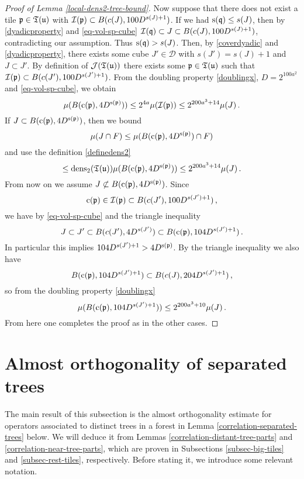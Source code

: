 {\begin{proof}[Proof of Lemma \ref{local-dens2-tree-bound}]
    Now suppose that there does not exist a tile ${\mathfrak p} \in {\mathfrak T}({\mathfrak u})$ with ${\mathcal{I}}({\mathfrak p}) \subset B(c(J), 100 D^{s(J) + 1})$. If we had ${\mathrm{s}}({\mathfrak q}) \le s(J)$, then by \eqref{dyadicproperty} and \eqref{eq-vol-sp-cube}  ${\mathcal{I}}({\mathfrak q}) \subset J \subset B(c(J), 100 D^{s(J) + 1})$, contradicting our assumption. Thus ${\mathrm{s}}({\mathfrak q}) > s(J)$. Then, by \eqref{coverdyadic} and \eqref{dyadicproperty}, there exists some cube $J' \in \mathcal{D}$ with $s(J') = s(J) + 1$ and $J \subset J'$. By definition of $\mathcal{J}({\mathfrak T}({\mathfrak u}))$ there exists some ${\mathfrak p} \in {\mathfrak T}({\mathfrak u})$ such that ${\mathcal{I}}({\mathfrak p}) \subset B(c(J'), 100 D^{s(J') + 1})$.  From the doubling property \eqref{doublingx}, $D=2^{100a^2}$ and \eqref{eq-vol-sp-cube}, we obtain
    \begin{equation}
        \label{eq-measure-comparison-1}
        \mu(B({\mathrm{c}}({\mathfrak p}), 4D^{{\mathrm{s}}({\mathfrak p})})) \le 2^{4a} \mu({\mathcal{I}}({\mathfrak p})) \le 2^{200a^3 + 14} \mu(J)\,.
    \end{equation}
    If $J \subset B({\mathrm{c}}({\mathfrak p}), 4 D^{{\mathrm{s}}({\mathfrak p})})$, then we bound
    $$
        \mu(J \cap F) \le \mu(B({\mathrm{c}}({\mathfrak p}), 4D^{{\mathrm{s}}({\mathfrak p})}) \cap F)
    $$
    and use the definition \eqref{definedens2}
    $$
        \le \operatorname{\operatorname{dens}}_2({\mathfrak T}({\mathfrak u})) \mu(B({\mathrm{c}}({\mathfrak p}), 4D^{{\mathrm{s}}({\mathfrak p})})) \le 2^{200a^3 + 14} \mu(J)\,.
    $$
    From now on we assume $J \not \subset B({\mathrm{c}}({\mathfrak p}), 4 D^{{\mathrm{s}}({\mathfrak p})})$.
    Since
    \begin{equation*}
        {\mathrm{c}}({\mathfrak p}) \in {\mathcal{I}}({\mathfrak p}) \subset B(c(J'), 100 D^{s(J') + 1})\, ,
    \end{equation*}
    we have by \eqref{eq-vol-sp-cube} and the triangle inequality
    $$
        J \subset J' \subset B(c(J'), 4D^{s(J')}) \subset B({\mathrm{c}}({\mathfrak p}), 104 D^{s(J') + 1})\,.
    $$
    In particular this implies $104 D^{s(J') + 1} > 4D^{{\mathrm{s}}({\mathfrak p})}$. By the triangle inequality we also have
    $$
        B({\mathrm{c}}({\mathfrak p}), 104 D^{s(J') + 1}) \subset B(c(J), 204 D^{s(J') + 1})\,,
    $$
    so from the doubling property \eqref{doublingx}
    $$
        \mu( B({\mathrm{c}}({\mathfrak p}), 104 D^{s(J') + 1})) \le 2^{200a^3 + 10} \mu(J)\,.
    $$
    From here one completes the proof as in the other cases.
\end{proof}

\section{Almost orthogonality of separated trees}

The main result of this subsection is the almost orthogonality estimate for operators associated to distinct trees in a forest in Lemma \ref{correlation-separated-trees} below. We will deduce it from Lemmas \ref{correlation-distant-tree-parts} and \ref{correlation-near-tree-parts}, which are proven in Subsections \ref{subsec-big-tiles} and \ref{subsec-rest-tiles}, respectively. Before stating it, we introduce some relevant notation.

}
